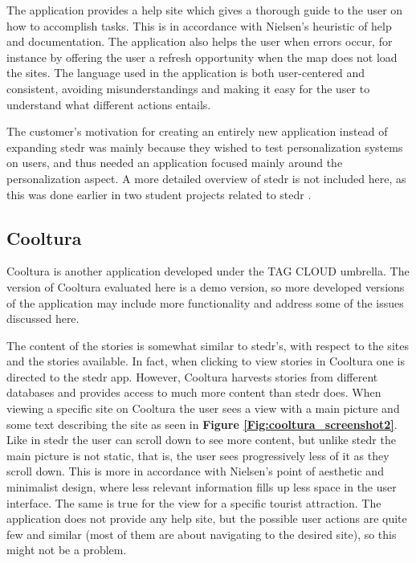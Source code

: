 The application provides a help site which gives a thorough guide to the user on how to accomplish tasks. This is in accordance with Nielsen's heuristic of help and documentation. The application also helps the user when errors occur, for instance by offering the user a refresh opportunity when the map does not load the sites. The language used in the application is both user-centered and consistent, avoiding misunderstandings and making it easy for the user to understand what different actions entails. \newline

The customer’s motivation for creating an entirely new application instead of expanding stedr was mainly because they wished to test personalization systems on users, and thus needed an application focused mainly around the personalization aspect. A more detailed overview of stedr is not included here, as this was done earlier in two student projects related to stedr \cite{es26}.

\subsection{Cooltura}

Cooltura is another application developed under the TAG CLOUD umbrella. The version of Cooltura evaluated here is a demo version, so more developed versions of the application may include more functionality and address some of the issues discussed here. \newline

The content of the stories is somewhat similar to stedr's, with respect to the sites and the stories available. In fact, when clicking to view stories in Cooltura one is directed to the stedr app. However, Cooltura harvests stories from different databases and provides access to much more content than stedr does. When viewing a specific site on Cooltura the user sees a view with a main picture and some text describing the site as seen in \textbf{Figure \ref{Fig:cooltura_screenshot2}}. Like in stedr the user can scroll down to see more content, but unlike stedr the main picture is not static, that is, the user sees progressively less of it as they scroll down. This is more in accordance with Nielsen's point of aesthetic and minimalist design, where less relevant information fills up less space in the user interface. The same is true for the view for a specific tourist attraction. The application does not provide any help site, but the possible user actions are quite few and similar (most of them are about navigating to the desired site), so this might not be a problem.\newline

